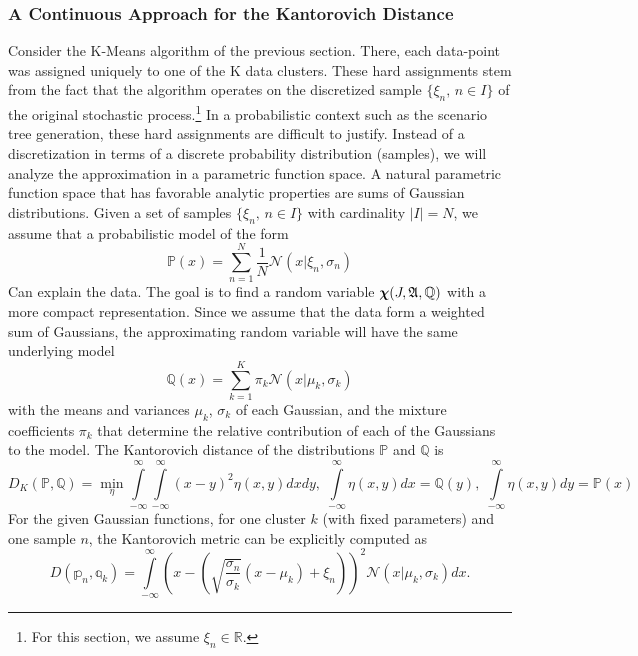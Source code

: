 \subsubsection{A Continuous Approach for the Kantorovich Distance}
\label{sec:cont-appr-kant}
Consider the K-Means algorithm of the previous section.
There, each data-point was assigned uniquely to one of the K data clusters.
These hard assignments stem from the fact that the algorithm operates on the discretized sample $\{\xi_n,\, n\in I\}$ of the original stochastic process.\footnote{For this section, we assume $\xi_n\in\mathbb{R}$.}
In a probabilistic context such as the scenario tree generation, these hard assignments are difficult to justify.
Instead of a discretization in terms of a discrete probability distribution (samples), we will analyze the approximation in a parametric function space.
A natural parametric function space that has favorable analytic properties are sums of Gaussian distributions.
Given a set of samples $\{\xi_n,\, n\in I\}$ with cardinality $|I|=N$, we assume that a probabilistic model of the form
\begin{equation}
  \label{eq:31}
  \mathbb{P}(x) = \sum_{n=1}^N\frac{1}{N}\mathcal{N}(x|\xi_n,\sigma_n)
\end{equation}
Can explain the data.
The goal is to find a random variable $\boldsymbol\chi(J,\mathfrak{A},\mathbb{Q})$ with a more compact representation.
Since we assume that the data form a weighted sum of Gaussians, the approximating random variable will have the same underlying model
\begin{equation}
  \label{eq:32}
  \mathbb{Q}(x) = \sum_{k=1}^K\pi_k\mathcal{N}(x|\mu_k, \sigma_k)
\end{equation}
with the means and variances $\mu_k$, $\sigma_k$ of each Gaussian, and the mixture coefficients $\pi_k$ that determine the relative contribution of each of the Gaussians to the model.
The Kantorovich distance of the distributions $\mathbb{P}$ and $\mathbb{Q}$ is
\begin{equation}
  \label{eq:33}
  D_K(\mathbb{P,Q}) = \min\limits_{\eta}\int\limits_{-\infty}^{\infty}\int\limits_{-\infty}^{\infty}(x-y)^2\eta(x,y)dxdy,\; \int\limits_{-\infty}^{\infty}\eta(x,y)dx = \mathbb{Q}(y),\;\int\limits_{-\infty}^{\infty}\eta(x,y)dy = \mathbb{P}(x)
\end{equation}
For the given Gaussian functions, for one cluster $k$ (with fixed parameters) and one sample $n$, the Kantorovich metric can be explicitly computed as
\begin{equation}
  \label{eq:34}
  D(\mathbb{p}_n,\mathbb{q}_k) = \int\limits_{-\infty}^{\infty}\left(x-\left(\sqrt{\frac{\sigma_n}{\sigma_k}}(x-\mu_k)+\xi_n\right)\right)^2\mathcal{N}(x|\mu_k,\sigma_k)dx.
\end{equation}

